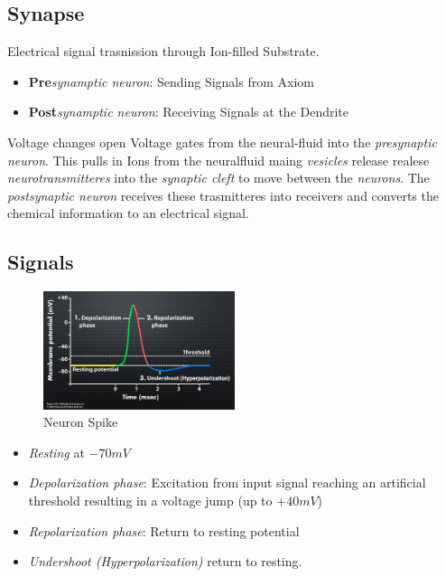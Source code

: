 \documentclass[
    fontsize      = 11pt,
    paper         = a4,
    twoside       = false,
    parskip       = half,
    pagesize      = false,
]{scrartcl}
\providecommand{\tightlist}{%
  \setlength{\itemsep}{0pt}\setlength{\parskip}{0pt}}
\begin{document}
\hypertarget{synapse}{%
\subsection{Synapse}\label{synapse}}

Electrical signal trasnission through Ion-filled Substrate.

\begin{itemize}
\tightlist
\item
  \textbf{Pre}\emph{synamptic neuron}: Sending Signals from Axiom
\item
  \textbf{Post}\emph{synamptic neuron}: Receiving Signals at the
  Dendrite
\end{itemize}

Voltage changes open Voltage gates from the neural-fluid into the
\emph{presynaptic neuron}. This pulls in Ions from the neuralfluid maing
\emph{vesicles} release realese \emph{neurotransmitteres} into the
\emph{synaptic cleft} to move between the \emph{neurons}. The
\emph{postsynaptic neuron} receives these trasmitteres into receivers
and converts the chemical information to an electrical signal.

\hypertarget{signals}{%
\subsection{Signals}\label{signals}}

\begin{figure}[htp]
\centering
\includegraphics[width=0.5\textwidth]{neuron-spike.png}
\caption{Neuron Spike}
\end{figure}

\begin{itemize}
\tightlist
\item
  \emph{Resting} at \(-70\si{mV}\)
\item
  \emph{Depolarization phase}: Excitation from input signal reaching an
  artificial threshold resulting in a voltage jump (up to
  \(+40\si{mV}\))
\item
  \emph{Repolarization phase}: Return to resting potential
\item
  \emph{Undershoot (Hyperpolarization)} return to resting.
\end{itemize}
\end{document}

